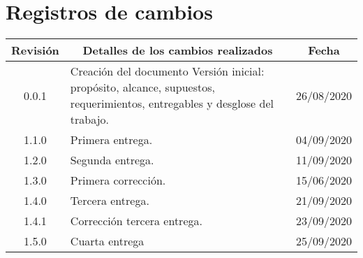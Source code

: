 \section{Registros de cambios}
\label{sec:registro}


\begin{table}[ht]
\label{tab:registro}
\centering
\begin{tabularx}{\linewidth}{@{}|c|X|c|@{}}
\hline
\rowcolor[HTML]{C0C0C0} 
Revisión & \multicolumn{1}{c|}{\cellcolor[HTML]{C0C0C0}Detalles de los cambios realizados} & Fecha      \\ \hline
0.0.1 & Creación del documento \newline Versión inicial: propósito, alcance, supuestos, requerimientos, entregables y desglose del trabajo.
                                     & 26/08/2020\\ \hline
1.1.0 & Primera entrega.             & 04/09/2020\\ \hline
1.2.0 & Segunda entrega.             & 11/09/2020\\ \hline
1.3.0 & Primera corrección.          & 15/06/2020\\ \hline
1.4.0 & Tercera entrega.             & 21/09/2020\\ \hline
1.4.1 & Corrección tercera entrega.  & 23/09/2020\\ \hline
1.5.0 & Cuarta entrega               & 25/09/2020\\ \hline
\end{tabularx}
\end{table}

\pagebreak
